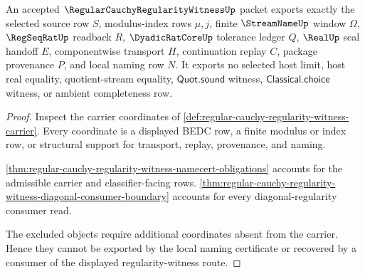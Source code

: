 \begin{theorem}
\label{thm:regular-cauchy-regularity-witness-no-hidden-limit}
An accepted $\RegularCauchyRegularityWitnessUp$ packet exports exactly the selected source row $S$, modulus-index rows $\mu,j$, finite $\StreamNameUp$ window $\Omega$, $\RegSeqRatUp$ readback $R$, $\DyadicRatCoreUp$ tolerance ledger $Q$, $\RealUp$ seal handoff $E$, componentwise transport $H$, continuation replay $C$, package provenance $P$, and local naming row $N$. It exports no selected host limit, host real equality, quotient-stream equality, $\mathsf{Quot.sound}$ witness, $\mathsf{Classical.choice}$ witness, or ambient completeness row.
\end{theorem}
\begin{proof}
Inspect the carrier coordinates of \autoref{def:regular-cauchy-regularity-witness-carrier}. Every coordinate is a displayed BEDC row, a finite modulus or index row, or structural support for transport, replay, provenance, and naming.

\autoref{thm:regular-cauchy-regularity-witness-namecert-obligations} accounts for the admissible carrier and classifier-facing rows. \autoref{thm:regular-cauchy-regularity-witness-diagonal-consumer-boundary} accounts for every diagonal-regularity consumer read.

The excluded objects require additional coordinates absent from the carrier. Hence they cannot be exported by the local naming certificate or recovered by a consumer of the displayed regularity-witness route.
\end{proof}

